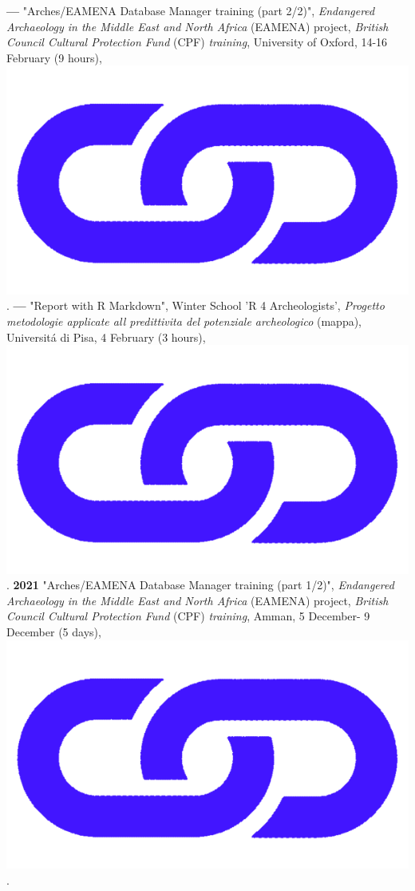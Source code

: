 \documentclass{article}
\begin{document}
\textbf{--- }"Arches/EAMENA Database Manager training (part 2/2)", \textit{Endangered Archaeology in the Middle East and North Africa} (EAMENA) project, \textit{British Council Cultural Protection Fund} (CPF) \textit{training}, University of Oxford, 14-16 February (9 hours), \href{https://github.com/eamena-oxford/eamena-arches-dev/tree/main/training#readme}{\includegraphics[scale=0.02]{link_darkblue.png}}.
\smallbreak
\textbf{--- }"Report with R Markdown", Winter School 'R 4 Archeologists', \textit{Progetto metodologie applicate all predittivita del potenziale archeologico} (mappa), Universit\'{a} di Pisa, 4 February (3 hours), \href{https://github.com/zoometh/thomashuet/tree/main/profiles/oxford/R4A#readme}{\includegraphics[scale=0.02]{link_darkblue.png}}.
\smallbreak
\textbf{2021 }"Arches/EAMENA Database Manager training (part 1/2)", \textit{Endangered Archaeology in the Middle East and North Africa} (EAMENA) project, \textit{British Council Cultural Protection Fund} (CPF) \textit{training}, Amman, 5 December- 9 December (5 days), \href{https://github.com/eamena-oxford/eamena-arches-dev/tree/main/training#readme}{\includegraphics[scale=0.02]{link_darkblue.png}}.
\end{document}
